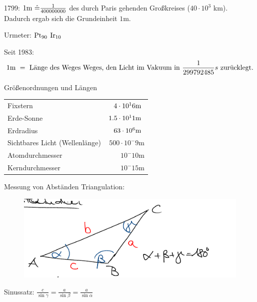 \documentclass[a4paper,10pt]{scrartcl}
\begin{document}
\begin{enumerate}[a)]
 1799: $1 \text{m } \hat = \frac{1}{400000000}$ des durch Paris gehenden Großkreises ($40\cdot 10^3$ km). Dadurch ergab sich die Grundeinheit $1$m.

 Urmeter: $\ce{Pt_{90}}$ $\ce{Ir_{10}}$

 Seit 1983:
 \[
  1\text{m }=\text{ Länge des Weges Weges, den Licht im Vakuum in $\frac{1}{299792485} s$ zurücklegt.}
 \]

\begin{seg}{Größenordnungen und Längen}


 \begin{tabular}{l r}
  Fixstern & $4\cdot 10^16 \text{m }$\\
  Erde-Sonne & $1.5 \cdot 10^11 \text{m }$\\
 Erdradius & $63 \cdot 10^6 \text{m } $\\
 Sichtbares Licht (Wellenlänge) & $ 500\cdot 10^-9$m \\
 Atomdurchmesser & $10^-10$m  \\
 Kerndurchmesser & $10 ^-15$m
 \end{tabular}
 \end{seg}
 \begin{seg}{Messung von Abständen}
 Triangulation:
 \begin{figure}[h]
  \includegraphics[scale=0.5]{fig7.png}
 \end{figure}
 Sinussatz: $\frac{c}{\sin\gamma} = \frac{a}{\sin{\beta}}=\frac{a}{\sin\alpha}$ \\
 

\end{seg}
\end{enumerate}
\end{document}
